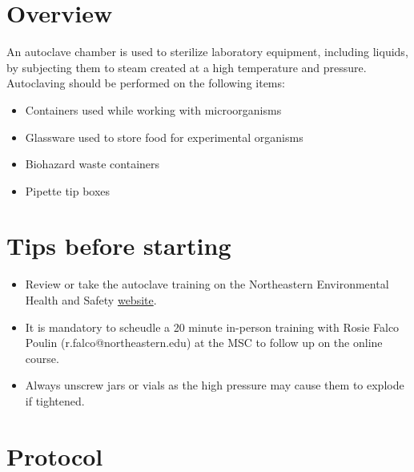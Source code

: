 \documentclass[
  letterpaper,
  DIV=11,
  numbers=noendperiod]{scrreprt}
\begin{document}
\hypertarget{overview}{%
\section*{\texorpdfstring{\textbf{Overview}}{Overview}}\label{overview}}

An autoclave chamber is used to sterilize laboratory equipment,
including liquids, by subjecting them to steam created at a high
temperature and pressure. Autoclaving should be performed on the
following items:

\begin{itemize}
\item
  Containers used while working with microorganisms
\item
  Glassware used to store food for experimental organisms
\item
  Biohazard waste containers
\item
  Pipette tip boxes
\end{itemize}

\hypertarget{tips-before-starting}{%
\section*{\texorpdfstring{\textbf{Tips before
starting}}{Tips before starting}}\label{tips-before-starting}}

\begin{itemize}
\item
  Review or take the autoclave training on the Northeastern
  Environmental Health and Safety
  \href{https://northeastern.bioraft.com/node/1895187}{website}.
\item
  It is mandatory to scheudle a 20 minute in-person training with Rosie
  Falco Poulin (r.falco@northeastern.edu) at the MSC to follow up on the
  online course.
\item
  Always unscrew jars or vials as the high pressure may cause them to
  explode if tightened.
\end{itemize}

\hypertarget{protocol}{%
\section*{\texorpdfstring{\textbf{Protocol}}{Protocol}}\label{protocol}}
\end{document}
